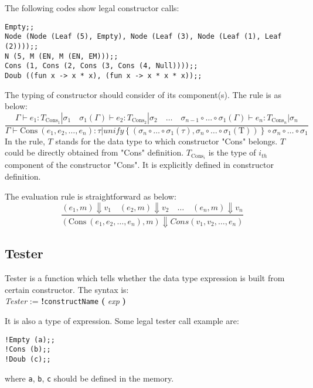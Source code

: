 \documentclass[a4paper,12pt]{article}
\begin{document}
		The following codes show legal constructor calls:
		\begin{lstlisting}
Empty;;
Node (Node (Leaf (5), Empty), Node (Leaf (3), Node (Leaf (1), Leaf (2))));;
N (5, M (EN, M (EN, EM)));;
Cons (1, Cons (2, Cons (3, Cons (4, Null))));;
Doub ((fun x -> x * x), (fun x -> x * x * x));;
		\end{lstlisting}
	
		The typing of constructor should consider of its component(s). The rule is as below:
		\begin{equation*}
			\frac{
				\Gamma \vdash e_1: T_{\mathrm{Cons}_1} | \sigma_1 \quad \sigma_1(\Gamma) \vdash e_2: T_{\mathrm{Cons}_2} | \sigma_2 \quad  \dots \quad \sigma_{n-1} \circ \dots \circ \sigma_1(\Gamma) \vdash e_n: T_{\mathrm{Cons}_n} | \sigma_n
			}{  
				\Gamma \vdash \mathrm{Cons\ } (e_1, e_2, \dots, e_n): \tau \vert \mathit{unify}\left\{ (\sigma_n \circ \dots \circ \sigma_1 (\tau), \sigma_n \circ \dots \circ \sigma_1 (\mathrm{T})) \right\} \circ \sigma_n \circ \dots \circ \sigma_1
			}
		\end{equation*}
		In the rule, $T$ stands for the data type to which constructor "Cons" belongs. $T$ could be directly obtained from "Cons" definition. $T_{\mathrm{Cons}_i}$ is the type of $i_{\mathit{th}}$ component of the constructor "Cons". It is explicitly defined in constructor definition.
		
		The evaluation rule is straightforward as below:
		\begin{equation*}
			\frac{
				(e_1,m) \Downarrow v_1 \quad (e_2, m) \Downarrow v_2 \quad \dots \quad (e_n,m) \Downarrow v_n
			}{
				(\mathrm{Cons\ }(e_1, e_2, \dots, e_n), m) \Downarrow \mathit{Cons} (v_1, v_2, \dots, e_n)
			}
		\end{equation*}
			
	\subsection{Tester}
		Tester is a function which tells whether the data type expression is built from certain constructor. The syntax is:\\
		\textit{Tester} := \textbf{!}\texttt{constructName} \textbf{(} \textit{exp} \textbf{)}
		
		It is also a type of expression. Some legal tester call example are:
		\begin{lstlisting}
!Empty (a);;
!Cons (b);;
!Doub (c);;
		\end{lstlisting}
		where \texttt{a}, \texttt{b}, \texttt{c} should be defined in the memory.
		
\end{document}
